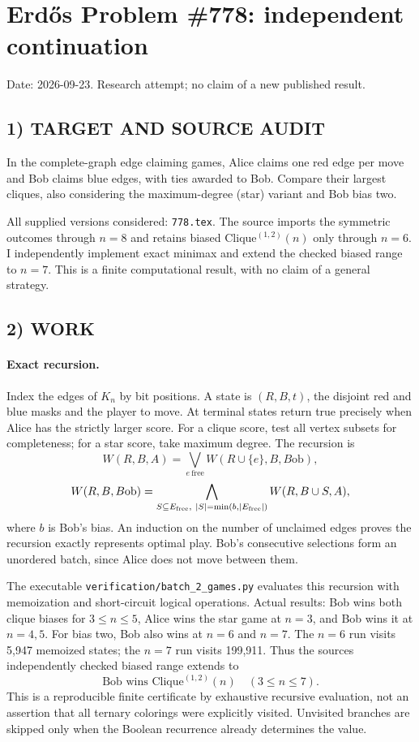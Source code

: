 \section{Erd\H{o}s Problem \#778: independent continuation}
\noindent Date: 2026-09-23. Research attempt; no claim of a new published result.
\subsection{1) TARGET AND SOURCE AUDIT}
In the complete-graph edge claiming games, Alice claims one red edge per move and Bob claims blue edges, with ties awarded to Bob. Compare their largest cliques, also considering the maximum-degree (star) variant and Bob bias two.

All supplied versions considered: \texttt{778.tex}.
The source imports the symmetric outcomes through $n=8$ and retains biased Clique$^{(1,2)}(n)$ only through $n=6$. I independently implement exact minimax and extend the checked biased range to $n=7$. This is a finite computational result, with no claim of a general strategy.
\subsection{2) WORK}
\paragraph{Exact recursion.}
Index the edges of $K_n$ by bit positions. A state is $(R,B,t)$, the disjoint red and blue masks and the player to move. At terminal states return true precisely when Alice has the strictly larger score. For a clique score, test all vertex subsets for completeness; for a star score, take maximum degree. The recursion is
\[
W(R,B,A)=\bigvee_{e\ \mathrm{free}}W(R\cup\{e\},B,B\mathrm{ob}),
\]
\[
W(R,B,B\mathrm{ob})=\bigwedge_{S\subseteq E_{\rm free},\ |S|=\min(b,|E_{\rm free}|)}W(R,B\cup S,A),
\]
where $b$ is Bob's bias. An induction on the number of unclaimed edges proves the recursion exactly represents optimal play. Bob's consecutive selections form an unordered batch, since Alice does not move between them.

The executable \texttt{verification/batch\_2\_games.py} evaluates this recursion with memoization and short-circuit logical operations. Actual results: Bob wins both clique biases for $3\le n\le5$, Alice wins the star game at $n=3$, and Bob wins it at $n=4,5$. For bias two, Bob also wins at $n=6$ and $n=7$. The $n=6$ run visits 5,947 memoized states; the $n=7$ run visits 199,911. Thus the source\textquotesingle s independently checked biased range extends to
\[
\boxed{\text{Bob wins Clique}^{(1,2)}(n)\quad(3\le n\le7).}
\]
This is a reproducible finite certificate by exhaustive recursive evaluation, not an assertion that all ternary colorings were explicitly visited. Unvisited branches are skipped only when the Boolean recurrence already determines the value.
